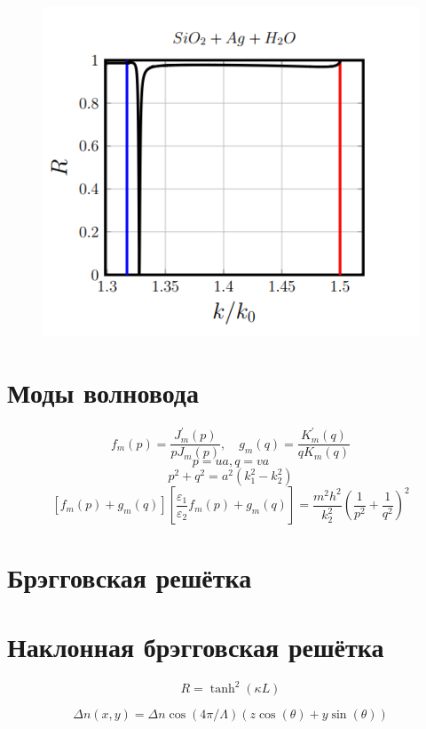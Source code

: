 \documentclass[t]{beamer}  %
\begin{document}
\begin{frame}
	\begin{figure}[h]
		\centering
		\includegraphics[width=0.7\linewidth]{screenshot005}
		\caption{}
		\label{fig:screenshot005}
	\end{figure}

\end{frame}

\section{Моды волновода}
\begin{frame}
	$$
	f_{m}(p)=\frac{J_{m}^{\prime}(p)}{p J_{m}(p)}, \quad g_{m}(q)=\frac{K_{m}^{\prime}(q)}{q K_{m}(q)} $$
	$$p=u a, q=v a $$
	$$p^{2}+q^{2}=a^{2}\left(k_{1}^{2}-k_{2}^{2}\right) $$
	$${\left[f_{m}(p)+g_{m}(q)\right]\left[\frac{\varepsilon_{1}}{\varepsilon_{2}} f_{m}(p)+g_{m}(q)\right]=\frac{m^{2} h^{2}}{k_{2}^{2}}\left(\frac{1}{p^{2}}+\frac{1}{q^{2}}\right)^{2}}
	$$
	
\end{frame}	
\section{Брэгговская решётка}
\begin{frame}
	
\end{frame}	
\section{Наклонная брэгговская решётка}
\begin{frame}
	
$$R=\tanh ^{2}(\kappa L)$$

$$\Delta n(x, y)=\Delta n \cos (4 \pi / \Lambda)(z \cos (\theta)+y \sin (\theta))$$
	
	
\end{frame}	
\end{document}
